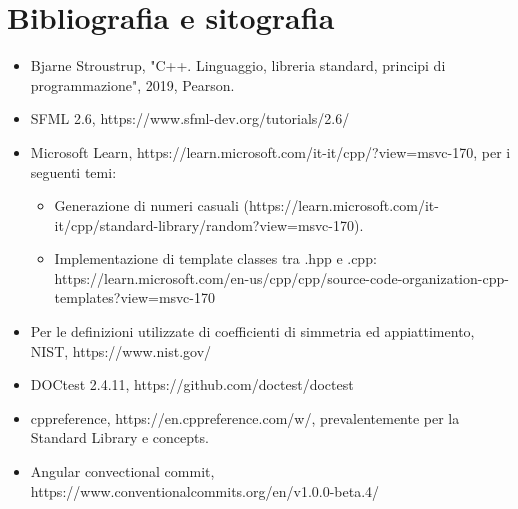 \documentclass{article}
\begin{document}
\section{Bibliografia e sitografia}

\begin{itemize}
    \item Bjarne Stroustrup, "C++. Linguaggio, libreria standard, principi di programmazione", 2019, Pearson.
    \item SFML 2.6, https://www.sfml-dev.org/tutorials/2.6/
    \item Microsoft Learn, https://learn.microsoft.com/it-it/cpp/?view=msvc-170, per i seguenti temi:
    \begin{itemize}
        \item Generazione di numeri casuali (https://learn.microsoft.com/it-it/cpp/standard-library/random?view=msvc-170).
        \item Implementazione di template classes tra .hpp e .cpp:
        https://learn.microsoft.com/en-us/cpp/cpp/source-code-organization-cpp-templates?view=msvc-170
    \end{itemize}
      \item Per le definizioni utilizzate di coefficienti di simmetria ed appiattimento, NIST, https://www.nist.gov/

      \item DOCtest 2.4.11, https://github.com/doctest/doctest
      \item cppreference, https://en.cppreference.com/w/, prevalentemente per la Standard Library e concepts.
      \item Angular convectional commit, https://www.conventionalcommits.org/en/v1.0.0-beta.4/   
\end{itemize}
\end{document}
